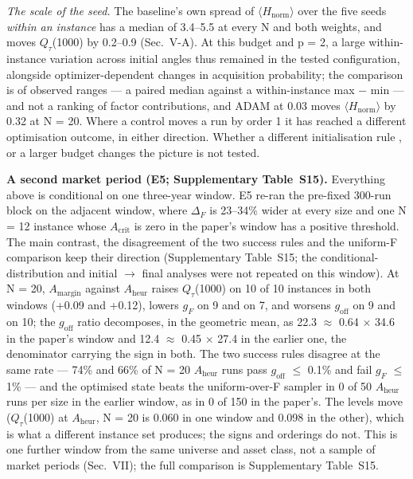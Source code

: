 \documentclass{ieeeaccess}
\begin{document}
\textit{The scale of the seed.} The baseline's own spread of $\langle$$H_{\mathrm{norm}}$$\rangle$ over the five seeds \textit{within an instance} has a median of 3.4--5.5 at every N and both weights, and moves $Q_{\tau}$(1000) by 0.2--0.9 (Sec.~V-A). At this budget and p = 2, a large within-instance variation across initial angles thus remained in the tested configuration, alongside optimizer-dependent changes in acquisition probability; the comparison is of observed ranges --- a paired median against a within-instance max $-$ min --- and not a ranking of factor contributions, and ADAM at 0.03 moves $\langle$$H_{\mathrm{norm}}$$\rangle$ by 0.32 at N = 20. Where a control moves a run by order 1 it has reached a different optimisation outcome, in either direction. Whether a different initialisation rule \cite{ref29}, \cite{ref30} or a larger budget changes the picture is not tested.


\textbf{A second market period (E5; Supplementary Table~S15).} Everything above is conditional on one three-year window. E5 re-ran the pre-fixed 300-run block on the adjacent window, where $\Delta_{F}$ is 23--34\% wider at every size and one N = 12 instance whose $A_{\mathrm{crit}}$ is zero in the paper's window has a positive threshold. The main contrast, the disagreement of the two success rules and the uniform-F comparison keep their direction (Supplementary Table~S15; the conditional-distribution and initial $\rightarrow$ final analyses were not repeated on this window). At N = 20, $A_{\mathrm{margin}}$ against $A_{\mathrm{heur}}$ raises $Q_{\tau}$(1000) on 10 of 10 instances in both windows (+0.09 and +0.12), lowers $g_{F}$ on 9 and on 7, and worsens $g_{\mathrm{off}}$ on 9 and on 10; the $g_{\mathrm{off}}$ ratio decomposes, in the geometric mean, as 22.3 $\approx$ 0.64 $\times$ 34.6 in the paper's window and 12.4 $\approx$ 0.45 $\times$ 27.4 in the earlier one, the denominator carrying the sign in both. The two success rules disagree at the same rate --- 74\% and 66\% of N = 20 $A_{\mathrm{heur}}$ runs pass $g_{\mathrm{off}}$ $\leq$ 0.1\% and fail $g_{F}$ $\leq$ 1\% --- and the optimised state beats the uniform-over-F sampler in 0 of 50 $A_{\mathrm{heur}}$ runs per size in the earlier window, as in 0 of 150 in the paper's. The levels move ($Q_{\tau}$(1000) at $A_{\mathrm{heur}}$, N = 20 is 0.060 in one window and 0.098 in the other), which is what a different instance set produces; the signs and orderings do not. This is one further window from the same universe and asset class, not a sample of market periods (Sec.~VII); the full comparison is Supplementary Table~S15.
\end{document}
